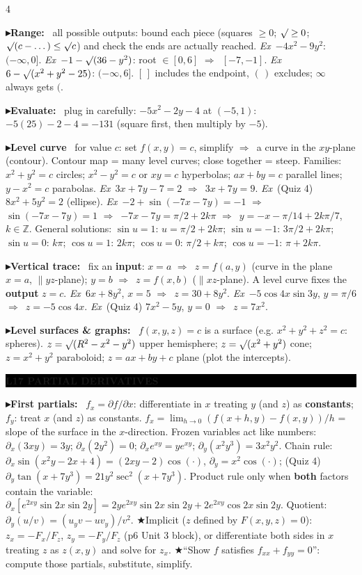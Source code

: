 \documentclass{article}
\newcommand\hd[1]{\par\vspace{0.5pt}\needspace{4\baselineskip}\noindent
  {\setlength\fboxsep{0.45pt}\colorbox{black}{\parbox{\dimexpr\linewidth-2\fboxsep}{\color{white}\bfseries #1}}}\par\nobreak\vspace{0.2pt}\nobreak}
\newcommand\pt[1]{\par\textbf{{\symf ▸}#1}\ }  %
\newcommand\ex{\textit{Ex}\ }                  %
\newcommand\shc{{\symf ★}}                      %
\newcommand\rt{\smash{\surd}}               %
\newcommand\then{\ensuremath{\Rightarrow}}
\begin{document}
\begin{multicols*}{4}
\pt{Range:} all possible outputs: bound each piece (squares $\ge0$; $\rt\ge0$; $\rt(c-\dots)\le\rt c$) and check the ends are actually reached. \ex $-4x^2-9y^2$: $(-\infty,0]$. \ex $-1-\rt(36-y^2)$: root $\in[0,6]$ \then\ $[-7,-1]$. \ex $6-\rt(x^2+y^2-25)$: $(-\infty,6]$. $[\,]$ includes the endpoint, $(\,)$ excludes; $\infty$ always gets $($.

\pt{Evaluate:} plug in carefully: $-5x^2-2y-4$ at $(-5,1)$: $-5(25)-2-4=-131$ (square first, then multiply by $-5$).

\pt{Level curve} for value $c$: set $f(x,y)=c$, simplify \then\ a curve in the $xy$-plane (contour). Contour map = many level curves; close together = steep. Families: $x^2+y^2=c$ circles; $x^2-y^2=c$ or $xy=c$ hyperbolas; $ax+by=c$ parallel lines; $y-x^2=c$ parabolas. \ex $3x+7y-7=2$ \then\ $3x+7y=9$. \ex (Quiz 4) $8x^2+5y^2=2$ (ellipse). \ex $-2+\sin(-7x-7y)=-1$ \then\ $\sin(-7x-7y)=1$ \then\ $-7x-7y=\pi/2+2k\pi$ \then\ $y=-x-\pi/14+2k\pi/7$, $k\in\mathbb Z$. General solutions: $\sin u=1$: $u=\pi/2+2k\pi$; $\sin u=-1$: $3\pi/2+2k\pi$; $\sin u=0$: $k\pi$; $\cos u=1$: $2k\pi$; $\cos u=0$: $\pi/2+k\pi$; $\cos u=-1$: $\pi+2k\pi$.

\pt{Vertical trace:} fix an \textbf{input}: $x=a$ \then\ $z=f(a,y)$ (curve in the plane $x=a$, $\parallel yz$-plane); $y=b$ \then\ $z=f(x,b)$ ($\parallel xz$-plane). A level curve fixes the \textbf{output} $z=c$. \ex $6x+8y^2$, $x=5$ \then\ $z=30+8y^2$. \ex $-5\cos4x\sin3y$, $y=\pi/6$ \then\ $z=-5\cos4x$. \ex (Quiz 4) $7x^2-5y$, $y=0$ \then\ $z=7x^2$.

\pt{Level surfaces \& graphs:} $f(x,y,z)=c$ is a surface (e.g. $x^2+y^2+z^2=c$: spheres). $z=\rt(R^2-x^2-y^2)$ upper hemisphere; $z=\rt(x^2+y^2)$ cone; $z=x^2+y^2$ paraboloid; $z=ax+by+c$ plane (plot the intercepts).

\hd{L17 PARTIAL DERIVATIVES}
\pt{First partials:} $f_x=\partial f/\partial x$: differentiate in $x$ treating $y$ (and $z$) as \textbf{constants}; $f_y$: treat $x$ (and $z$) as constants. $f_x=\lim_{h\to0}(f(x+h,y)-f(x,y))/h$ = slope of the surface in the $x$-direction. Frozen variables act like numbers: $\partial_x(3xy)=3y$; $\partial_x(2y^2)=0$; $\partial_x e^{xy}=ye^{xy}$; $\partial_y(x^2y^3)=3x^2y^2$. Chain rule: $\partial_x\sin(x^2y-2x+4)=(2xy-2)\cos(\cdot)$, $\partial_y=x^2\cos(\cdot)$; (Quiz 4) $\partial_y\tan(x+7y^3)=21y^2\sec^2(x+7y^3)$. Product rule only when \textbf{both} factors contain the variable: $\partial_x[e^{2xy}\sin2x\sin2y]=2ye^{2xy}\sin2x\sin2y+2e^{2xy}\cos2x\sin2y$. Quotient: $\partial_y(u/v)=(u_yv-uv_y)/v^2$. \shc Implicit ($z$ defined by $F(x,y,z)=0$): $z_x=-F_x/F_z$, $z_y=-F_y/F_z$ (p6 Unit 3 block), or differentiate both sides in $x$ treating $z$ as $z(x,y)$ and solve for $z_x$. \shc ``Show $f$ satisfies $f_{xx}+f_{yy}=0$'': compute those partials, substitute, simplify.


\end{multicols*}
\end{document}
